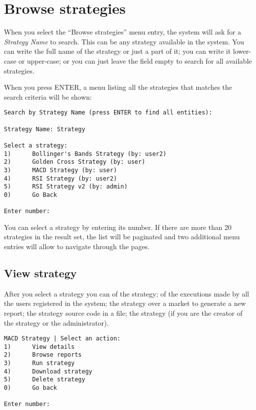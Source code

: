 \section{Browse strategies}\label{sec:browsestrategies}

When you select the ``Browse strategies'' menu entry, the system will ask for a
\emph{Strategy Name} to search. This can be any strategy available in the
system. You can write the full name of the strategy or just a part of it; you
can write it lower-case or upper-case; or you can just leave the field empty to
search for all available strategies.

When you press ENTER, a menu listing all the strategies that matches the search
criteria will be shown:

\begin{verbatim}
Search by Strategy Name (press ENTER to find all entities):

Strategy Name: Strategy

Select a strategy: 
1)      Bollinger's Bands Strategy (by: user2)
2)      Golden Cross Strategy (by: user)
3)      MACD Strategy (by: user)
4)      RSI Strategy (by: user2)
5)      RSI Strategy v2 (by: admin)
0)      Go Back

Enter number:
\end{verbatim}

You can select a strategy by entering its number. If there are more than 20
strategies in the result set, the list will be paginated and two additional menu
entries will allow to navigate through the pages.

\subsection{View strategy}

After you select a strategy you can  of the strategy;
 of the executions made by all the users registered
in the system;  the strategy over a market to generate a new
report;  the strategy source code in a file;
 the strategy (if you are the creator of the strategy or the
administrator).

\begin{verbatim}
MACD Strategy | Select an action: 
1)      View details
2)      Browse reports
3)      Run strategy
4)      Download strategy
5)      Delete strategy
0)      Go back

Enter number: 
\end{verbatim}

